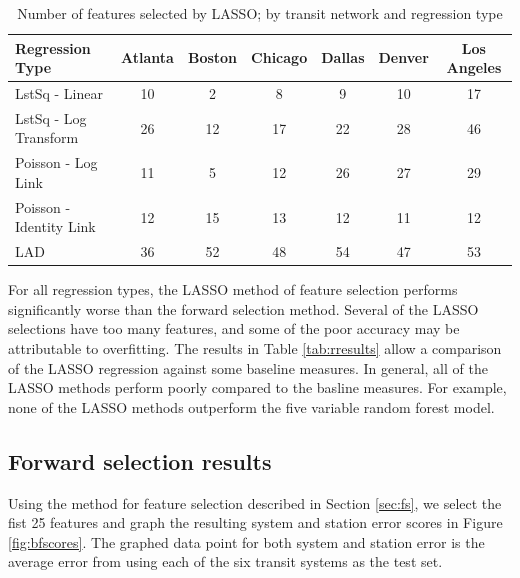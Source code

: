 \documentclass[11pt]{article}
\begin{document}
\begin{table}[H]
\begingroup\fontsize{10}{15}\selectfont
\centering
\begin{tabular}{l|cccccc}
Regression Type&Atlanta&Boston&Chicago&Dallas&Denver&Los Angeles\\
\midrule
LstSq - Linear&10&2&8&9&10&17\\
LstSq - Log Transform&26&12&17&22&28&46\\
Poisson - Log Link&11&5&12&26&27&29\\
Poisson - Identity Link&12&15&13&12&11&12\\
LAD&36&52&48&54&47&53\\
\end{tabular}
\caption{Number of features selected by LASSO; by transit network and regression type}\label{tab:lassoFeatNum}
\endgroup
\end{table}


For all regression types, the LASSO method of feature selection performs significantly worse than the forward selection method. Several of the LASSO selections have too many features, and some of the poor accuracy may be attributable to overfitting. The results in Table \ref{tab:rresults} allow a comparison of the LASSO regression against some baseline measures. In general, all of the LASSO methods perform poorly compared to the basline measures. For example, none of the LASSO methods outperform the five variable random forest model. 


\subsection{Forward selection results}

Using the method for feature selection described in Section \ref{sec:fs}, we select the fist 25 features and graph the resulting system and station error scores in Figure \ref{fig:bfscores}. The graphed data point for both system and station error is the average error from using each of the six transit systems as the test set. 
\end{document}
